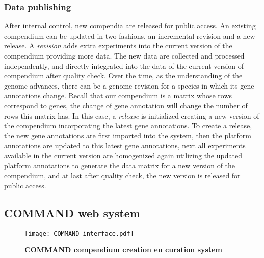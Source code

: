 \subsubsection{Data publishing}
%
After internal control, new compendia are released for public access.
%
An existing compendium can be updated in two fashions, an incremental revision
and a new release.
%
A \textit{revision} adds extra experiments into the current version of the
compendium providing more data.
%
The new data are collected and processed independently, and directly
integrated into the data of the current version of compendium after quality
check.
%
Over the time, as the understanding of the genome advances, there can be a
genome revision for a species in which its gene annotations change.
%
Recall that our compendium is a matrix whose rows correspond to genes, the
change of gene annotation will change the number of rows this matrix has.
%
In this case, a \textit{release} is initialized creating a new version of the
compendium incorporating the latest gene annotations.
%
To create a release, the new gene annotations are first imported into the
system, then the platform annotations are updated to this latest gene
annotations, next all experiments available in the current version are
homogenized again utilizing the updated platform annotations to generate the
data matrix for a new version of the compendium, and at last after quality
check, the new version is released for public access.





\subsection{COMMAND web system}




\begin{figure}
  \centering
  \texttt{[image: COMMAND\_interface.pdf]}
  \caption[COMMAND compendium creation en curation system]{
    \textbf{COMMAND compendium creation en curation system}}
  \label{fig:command-interface}
\end{figure}

